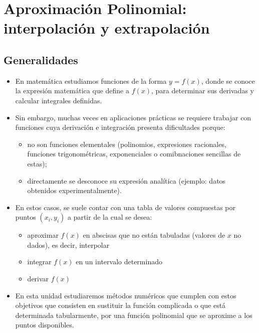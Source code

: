 \documentclass[openany]{book}
\providecommand{\tightlist}{%
  \setlength{\itemsep}{0pt}\setlength{\parskip}{0pt}}
\begin{document}
\hypertarget{aproximaciuxf3n-polinomial-interpolaciuxf3n-y-extrapolaciuxf3n}{%
\chapter{Aproximación Polinomial: interpolación y extrapolación}\label{aproximaciuxf3n-polinomial-interpolaciuxf3n-y-extrapolaciuxf3n}}

\hypertarget{generalidades-2}{%
\section{Generalidades}\label{generalidades-2}}

\begin{itemize}
\item
  En matemática estudiamos funciones de la forma \(y = f(x)\), donde se conoce la expresión matemática que define a \(f(x)\), para determinar sus derivadas y calcular integrales definidas.
\item
  Sin embargo, muchas veces en aplicaciones prácticas se requiere trabajar con funciones cuya derivación e integración presenta dificultades porque:

  \begin{itemize}
  \tightlist
  \item
    no son funciones elementales (polinomios, expresiones racionales, funciones trigonométricas, exponenciales o comibnaciones sencillas de estas);
  \item
    directamente se desconoce su expresión analítica (ejemplo: datos obtenidos experimentalmente).
  \end{itemize}
\item
  En estos casos, se suele contar con una tabla de valores compuestas por puntos \((x_i, y_i)\) a partir de la cual se desea:

  \begin{itemize}
  \tightlist
  \item
    aproximar \(f(x)\) en abscisas que no están tabuladas (valores de \(x\) no dados), es decir, interpolar
  \item
    integrar \(f(x)\) en un intervalo determinado
  \item
    derivar \(f(x)\)
  \end{itemize}
\item
  En esta unidad estudiaremos métodos numéricos que cumplen con estos objetivos que consisten en sustituir la función complicada o que está determinada tabularmente, por una función polinomial que se aproxime a los puntos disponibles.
\end{itemize}
\end{document}
